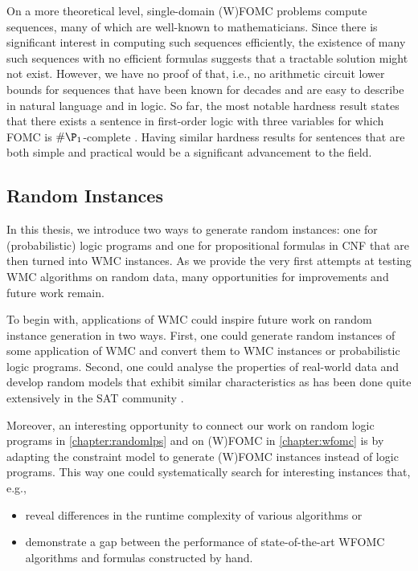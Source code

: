 On a more theoretical level, single-domain (W)FOMC problems compute sequences,
many of which are well-known to mathematicians. Since there is significant
interest in computing such sequences efficiently, the existence of many such
sequences with no efficient formulas suggests that a tractable solution might
not exist. However, we have no proof of that, i.e., no arithmetic circuit lower
bounds for sequences that have been known for decades and are easy to describe
in natural language and in logic. So far, the most notable hardness result
states that there exists a sentence in first-order logic with three variables
for which FOMC is $\#\P_1$-complete \citep{DBLP:conf/pods/BeameBGS15}. Having
similar hardness results for sentences that are both simple and practical would
be a significant advancement to the field.

\subsection{Random Instances}

In this thesis, we introduce two ways to generate random instances: one for
(probabilistic) logic programs and one for propositional formulas in CNF that
are then turned into WMC instances. As we provide the very first attempts at
testing WMC algorithms on random data, many opportunities for improvements and
future work remain.

To begin with, applications of WMC could inspire future work on random instance
generation in two ways. First, one could generate random instances of some
application of WMC and convert them to WMC instances or probabilistic logic
programs. Second, one could analyse the properties of real-world data and
develop random models that exhibit similar characteristics as has been done
quite extensively in the SAT community
\citep{DBLP:conf/ijcai/AnsoteguiBL09,DBLP:conf/tacas/BlasiusFS19,DBLP:journals/ai/Giraldez-CruL16,DBLP:conf/ijcai/Giraldez-CruL17}.

Moreover, an interesting opportunity to connect our work on random logic
programs in \cref{chapter:randomlps} and on (W)FOMC in \cref{chapter:wfomc} is
by adapting the constraint model to generate (W)FOMC instances instead of logic
programs. This way one could systematically search for interesting instances
that, e.g.,
\begin{itemize}
  \item reveal differences in the runtime complexity of various algorithms or
  \item demonstrate a gap between the performance of state-of-the-art WFOMC
        algorithms and formulas constructed by hand.
\end{itemize}

